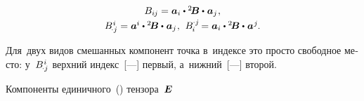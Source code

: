 \begin{otherlanguage}{russian}
\begin{equation}
\begin{array}{c}
B_{i\hspace{-0.1ex}j} = \bm{a}_i \dotp {^2\!\bm{B}} \dotp \hspace{.1ex} \bm{a}_j \hspace{.1ex}, \\[0.25em]
%
B_{\hspace{-0.2ex} \cdot j}^{\hspace{.1ex}i} = \bm{a}^{\hspace{-0.05ex}i} \dotp {^2\!\bm{B}} \dotp \hspace{.1ex} \bm{a}_j \hspace{.1ex}, \:\,
B_{\hspace{-0.1ex}i}^{\hspace{-0.05ex} \cdot j} \hspace{-0.2ex} = \bm{a}_i \dotp {^2\!\bm{B}} \dotp \hspace{.1ex} \bm{a}^{\hspace{.1ex}j} \hspace{-0.1ex}.
\end{array}\end{equation}

\vspace{-0.1em}\noindent Для~двух видов смешанных компонент точка в~индексе это просто свободное место: у~${B_{\hspace{-0.2ex} \cdot j}^{\hspace{.1ex}i}}$ верхний индекс~[---] первый, а~ниж\-ний~[---] второй.

Компоненты единичного~() тензора~$\bm{E}$


\end{otherlanguage}
